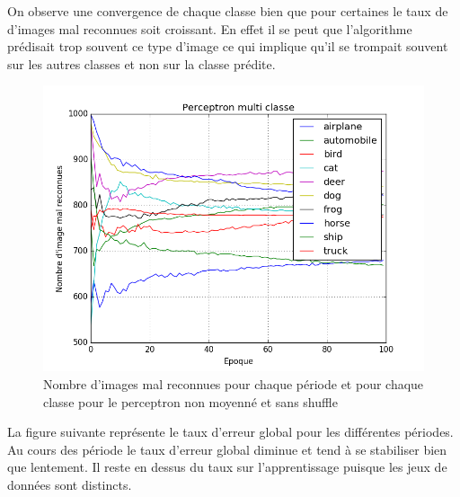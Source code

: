
On observe une convergence de chaque classe bien que pour certaines le taux de d'images mal reconnues soit croissant. En effet il se peut que l'algorithme prédisait trop souvent ce type d'image ce qui implique qu'il se trompait souvent sur les autres classes et non sur la classe prédite.

\begin{figure}[H]
\begin{center}
\includegraphics[width=\textwidth]{images/Perceptron_multiclasse_non_moyenne.png}
\caption{Nombre d'images mal reconnues pour chaque période et pour chaque classe pour le perceptron non moyenné et sans shuffle}
\end{center}
\end{figure}

La figure suivante représente le taux d'erreur global pour les différentes périodes.
Au cours des période le taux d'erreur global diminue et tend à se stabiliser bien que lentement. Il reste en dessus du taux sur l'apprentissage puisque les jeux de données sont distincts.

